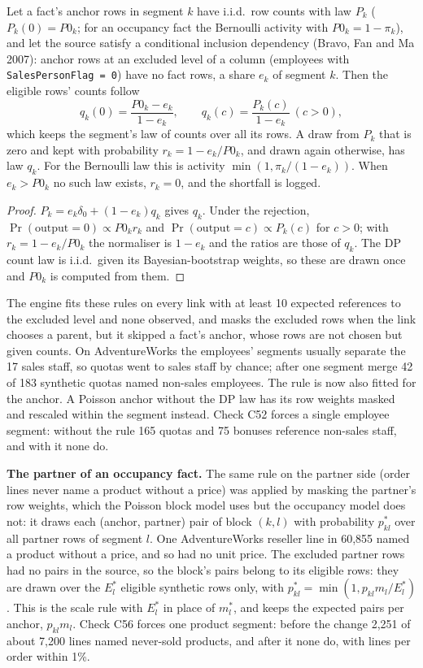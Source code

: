 \begin{proposition}\label{prop:anchorincl}
Let a fact's anchor rows in segment $k$ have i.i.d.\ row counts with law $P_k$ ($P_k(0)=P0_k$; for an occupancy fact the Bernoulli activity with $P0_k=1-\pi_k$), and let the source satisfy a conditional inclusion dependency (Bravo, Fan and Ma 2007): anchor rows at an excluded level of a column (employees with \texttt{SalesPersonFlag = 0}) have no fact rows, a share $e_k$ of segment $k$. Then the eligible rows' counts follow
\[q_k(0)=\frac{P0_k-e_k}{1-e_k},\qquad q_k(c)=\frac{P_k(c)}{1-e_k}\ (c>0),\]
which keeps the segment's law of counts over all its rows. A draw from $P_k$ that is zero and kept with probability $r_k=1-e_k/P0_k$, and drawn again otherwise, has law $q_k$. For the Bernoulli law this is activity $\min(1,\pi_k/(1-e_k))$. When $e_k>P0_k$ no such law exists, $r_k=0$, and the shortfall is logged.
\end{proposition}
\begin{proof}
$P_k=e_k\delta_0+(1-e_k)q_k$ gives $q_k$. Under the rejection, $\Pr(\text{output}=0)\propto P0_kr_k$ and $\Pr(\text{output}=c)\propto P_k(c)$ for $c>0$; with $r_k=1-e_k/P0_k$ the normaliser is $1-e_k$ and the ratios are those of $q_k$. The DP count law is i.i.d.\ given its Bayesian-bootstrap weights, so these are drawn once and $P0_k$ is computed from them.
\end{proof}
\noindent The engine fits these rules on every link with at least 10 expected references to the excluded level and none observed, and masks the excluded rows when the link chooses a parent, but it skipped a fact's anchor, whose rows are not chosen but given counts. On AdventureWorks the employees' segments usually separate the 17 sales staff, so quotas went to sales staff by chance; after one segment merge 42 of 183 synthetic quotas named non-sales employees. The rule is now also fitted for the anchor. A Poisson anchor without the DP law has its row weights masked and rescaled within the segment instead. Check C52 forces a single employee segment: without the rule 165 quotas and 75 bonuses reference non-sales staff, and with it none do.

\noindent\textbf{The partner of an occupancy fact.} The same rule on the partner side (order lines never name a product without a price) was applied by masking the partner's row weights, which the Poisson block model uses but the occupancy model does not: it draws each (anchor, partner) pair of block $(k,l)$ with probability $p^*_{kl}$ over all partner rows of segment $l$. One AdventureWorks reseller line in 60{,}855 named a product without a price, and so had no unit price. The excluded partner rows had no pairs in the source, so the block's pairs belong to its eligible rows: they are drawn over the $E^*_l$ eligible synthetic rows only, with $p^*_{kl}=\min(1,p_{kl}m_l/E^*_l)$. This is the scale rule with $E^*_l$ in place of $m^*_l$, and keeps the expected pairs per anchor, $p_{kl}m_l$. Check C56 forces one product segment: before the change 2{,}251 of about 7{,}200 lines named never-sold products, and after it none do, with lines per order within 1\%.

